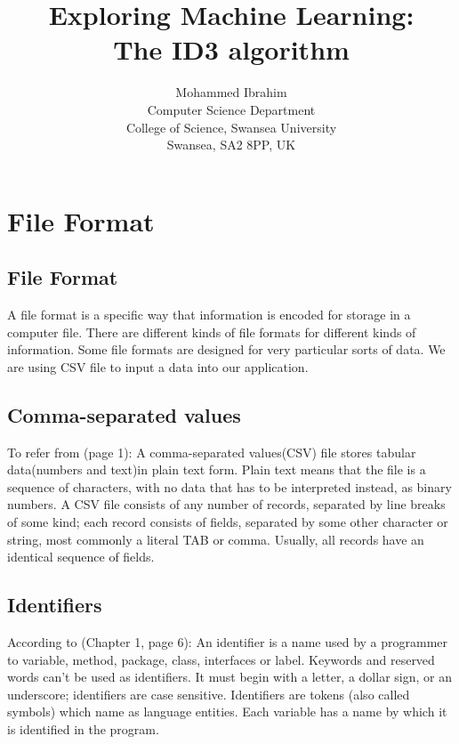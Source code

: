 \documentclass{report}
\begin{document}
\title{Exploring Machine Learning:\\
  The ID3 algorithm}

\author{Mohammed Ibrahim\\
 Computer Science Department\\
  College of Science, Swansea University\\
  Swansea, SA2 8PP, UK
}

\maketitle

\tableofcontents

\chapter{File Format}
\label{sec:fileformat}

\section{File Format}
\label{sec:file}

A file format is a specific way that information is encoded for storage in a computer file. There are different kinds of file formats for different kinds of information. Some file formats are designed for very particular sorts of data.
We are using CSV file to input a data into our application.

\section{Comma-separated values}
\label{sec:csv}

To refer from \cite{Wikipedia_CommaSeparatedValues}(page 1): A comma-separated values(CSV) file stores tabular data(numbers and text)in plain text form. Plain text means that the file is a sequence of characters, with no data that has to be interpreted instead, as binary numbers. A CSV file consists of any number of records, separated by line breaks of some kind; each record consists of fields, separated by some other character or string, most commonly a literal TAB or comma. Usually, all records have an identical sequence of fields.


\section{Identifiers}
\label{sec:ide}

According to \cite{Roberts2000CompleteJava2Certification}(Chapter 1, page 6): An identifier is a name used by a programmer to variable, method, package, class, interfaces or label. Keywords and reserved words can't be used as  identifiers. It must begin with a letter, a dollar sign, or an underscore; identifiers are case sensitive. Identifiers are tokens (also called symbols) which name as language entities. Each variable has a name by which it is identified in the program.
\end{document}
